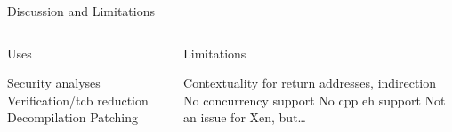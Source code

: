 \begin{frame}{Discussion and Limitations}
  \begin{columns}
    \begin{block}{Uses}
      \begin{outline}
        \1 Security analyses
        \1 Verification/\gls{tcb} reduction
        \1 Decompilation
        \1 Patching
      \end{outline}
    \end{block}

    \pause
    \begin{block}{Limitations}
      \begin{outline}
        \1 Contextuality for return addresses, indirection
        \1 No concurrency support
        \1 No \gls{cpp} \gls{eh} support
          \2 Not an issue for Xen, but\dots
      \end{outline}
    \end{block}
  \end{columns}
\end{frame}
